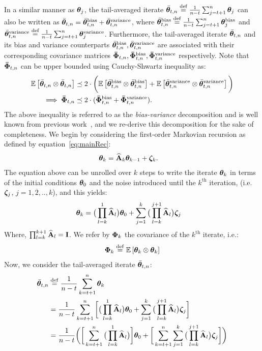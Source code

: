 In a similar manner as $\thetat$, the tail-averaged iterate $\thetavb \eqdef \frac{1}{n-t} \sum_{j=t+1}^n \thetat[j]$ can also be written as $\thetavb = \thetavb^{\textrm{bias}} + \thetavb^{\textrm{variance}}$, where $\thetavb^{\textrm{bias}} \eqdef \frac{1}{n-t} \sum_{j=t+1}^n \thetat[j]^{\textrm{bias}}$ and $\thetavb^{\textrm{variance}} \eqdef \frac{1}{n-t} \sum_{j=t+1}^n \thetat[j]^{\textrm{variance}}$. Furthermore, the tail-averaged iterate $\thetavb$ and its bias and variance counterparts $\thetavb^{\text{bias}},\thetavb^{\text{variance}}$ are associated with their corresponding covariance matrices $\phivb_{t,n},\phivb_{t,n}^{\text{bias}},\phivb_{t,n}^{\text{variance}}$ respectively. Note that $\phivb_{t,n}$ can be upper bounded using Cauchy-Shwartz inequality as:
\begin{align}\label{eq:tailAvgCovarBound}
		\E{\thetavb \otimes \thetavb} &\preceq 2\cdot\bigg( \E{\thetavb^{\text{bias}} \otimes \thetavb^{\text{bias}}} + \E{\thetavb^{\text{variance}} \otimes \thetavb^{\text{variance}}}\bigg)\nonumber\\
\implies\phivb_{t,n}&\preceq 2\cdot(\phivb_{t,n}^{\text{bias}}+\phivb_{t,n}^{\text{variance}}).
\end{align}
The above inequality is referred to as the {\em bias-variance} decomposition and is well known from previous work~\cite{BachM13,FrostigGKS15,JainKKNS16}, and we re-derive this decomposition for the sake of completeness.
\iffalse
We begin by considering the first-order Markovian recursion as defined by equation~\ref{eq:mainRec}:
\begin{align*}
\thetav_k&=\Ah_k\thetav_{k-1}+\zetav_k.
\end{align*}
The equation above can be unrolled over $k$ steps to write the iterate $\thetav_k$ in terms of the initial conditions $\thetav_0$ and the noise introduced until the $k^{\text{th}}$ iteration, (i.e. $\zetav_j$, $j=1,2,..,k$), and this yields:
\begin{align*}
\thetav_k&=\big(\prod_{l=k}^1\Ah_l\big)\thetav_0 + \sum_{j=1}^k\big(\prod_{l=k}^{j+1}\Ah_l\big)\zetav_j
\end{align*}
Where, $\prod_{l=k}^{k+1}\Ah_l=\eye$. We refer by $\phiv_k$ the covariance of the $k^{\text{th}}$ iterate, i.e.:
\begin{align}
\label{eq:finalIterateCovariance}
\phiv_k \defeq \E{\thetav_k\otimes\thetav_k}
\end{align}
Now, we consider the tail-averaged iterate $\thetavb$:
\begin{align*}
\thetavb&\defeq\frac{1}{n-t}\sum_{k=t+1}^n\thetav_k\\
&=\frac{1}{n-t}\sum_{k=t+1}^n\bigg[ \big(\prod_{l=k}^1\Ah_l\big)\thetav_0 + \sum_{j=1}^k\big(\prod_{l=k}^{j+1}\Ah_l\big)\zetav_j\bigg]\\
&=\frac{1}{n-t}\bigg( \bigg[\sum_{k=t+1}^n\big(\prod_{l=k}^1\Ah_l\big)\bigg]\thetav_0 + \bigg[\sum_{k=t+1}^n\sum_{j=1}^k\big(\prod_{l=k}^{j+1}\Ah_l\big)\zetav_j\bigg]\bigg)
\end{align*}
